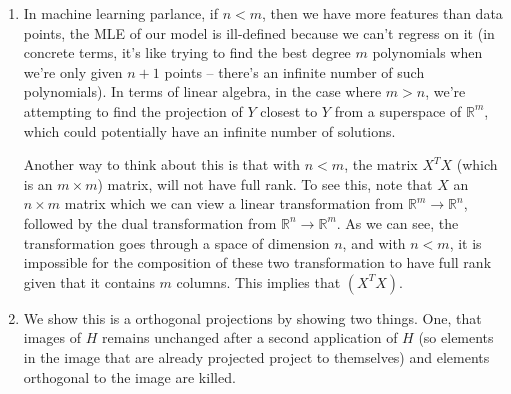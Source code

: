 \documentclass[submit]{harvardml}
\theoremstyle{plain}
\begin{document}
\begin{enumerate}[label=(\alph*)]
\item In machine learning parlance, if $n < m$, then we have more features than data points, the MLE of our model is ill-defined because we can't regress on it (in concrete terms, it's like trying to find the best degree $m$ polynomials when we're only given $n+1$ points -- there's an infinite number of such polynomials). In terms of linear algebra, in the case where $m > n$, we're attempting to find the projection of $Y$ closest to $Y$ from a superspace of $\mathbb{R}^m$, which could potentially have an infinite number of solutions.

Another way to think about this is that with $n < m$, the matrix $X^TX$ (which is an $m \times m$) matrix, will not have full rank. To see this, note that $X$ an $n \times m$ matrix which we can view a linear transformation from $\mathbb{R}^m \to \mathbb{R}^n$, followed by the dual transformation from $\mathbb{R}^n \to \mathbb{R}^m$. As we can see, the transformation goes through a space of dimension $n$, and with $n < m$, it is impossible for the composition of these two transformation to have full rank given that it contains $m$ columns. This implies that $(X^TX)$.

\item We show this is a orthogonal projections by showing two things. One, that images of $H$ remains unchanged after a second application of $H$ (so elements in the image that are already projected project to themselves) and elements orthogonal to the image are killed.


\end{enumerate}
\end{document}
